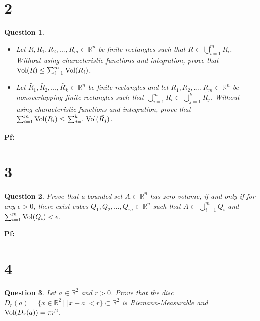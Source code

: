 \documentclass{article}
\newtheorem{question}{Question}
\begin{document}
\break

\section*{2}
\begin{myBox}[]{}
    \begin{question}

        \hfil

        \begin{itemize}
            \item[1.] Let $R,R_1,R_2,...,R_m\subset \mathbb{R}^n$ be finite rectangles such that $R\subset\bigcup_{i=1}^{m}R_i$. Without using characteristic functions and integration, prove that $\textmd{Vol}(R)\leq \sum_{i=1}^{m}\textmd{Vol}(R_i)$.
            \item[2.] Let $\tilde{R_1},\tilde{R_2},...,\tilde{R_k}\subset \mathbb{R}^n$ be finite rectangles and let $R_1,R_2,...,R_m\subset\mathbb{R}^n$ be nonoverlapping finite rectangles such that $\bigcup_{i=1}^{m}R_i\subset\bigcup_{j=1}^{k}\tilde{R_j}$. Without using characteristic functions and integration, prove that $\sum_{i=1}^{m}\textmd{Vol}(R_i)\leq\sum_{j=1}^{k}\textmd{Vol}(\tilde{R_j})$. 
        \end{itemize}
    \end{question}
\end{myBox}

\textbf{Pf:}

\break

\section*{3}
\begin{myBox}[]{}
    \begin{question}
        Prove that a bounded set $A\subset\mathbb{R}^n$ has zero volume, if and only if for any $\epsilon>0$, there exist cubes $Q_1,Q_2,...,Q_m\subset\mathbb{R}^n$ such that $A\subset\bigcup_{i=1}^{m}Q_i$ and $\sum_{i=1}^{m}\textmd{Vol}(Q_i)<\epsilon$.
    \end{question}
\end{myBox}

\textbf{Pf:}

\break

\section*{4}
\begin{myBox}[]{}
    \begin{question}
        Let $a\in\mathbb{R}^2$ and $r>0$. Prove that the disc $D_r(a)=\{x\in\mathbb{R}^2\ |\ |x-a|<r\}\subset\mathbb{R}^2$ is Riemann-Measurable and $\textmd{Vol}(D_r(a))=\pi r^2$.
    \end{question}
\end{myBox}
\end{document}

